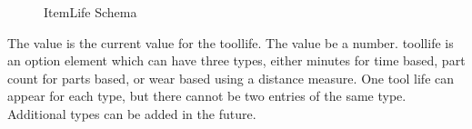 \begin{figure}[ht]
  \centering
  \caption{ItemLife Schema}
  \label{fig:itemlife-schema}
\end{figure}

\FloatBarrier

The value is the current value for the \gls{toollife}.  The value \MUST be a number. \gls{toollife} is an option element which can have three types, either minutes for time based, part count for parts based, or wear based using a distance measure.  One tool life can appear for each type, but there cannot be two entries of the same type.  Additional types can be added in the future.


